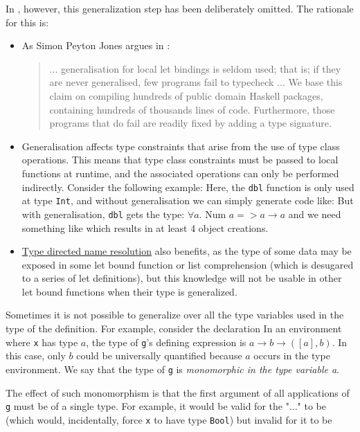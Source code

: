In \frege{}, however, this generalization step has been deliberately omitted. The rationale for this is:
\begin{itemize}
\item As Simon Peyton Jones argues in \cite{lsnbg}:
\begin{quote}
... generalisation for local let bindings is seldom used; that is; if they are never generalised, few programs fail to typecheck ... We base this claim on compiling hundreds of public domain Haskell packages, containing hundreds of thousands lines of code. Furthermore, those programs that do fail are readily fixed by adding a type signature.
\end{quote}
\item Generalisation affects type constraints that arise from the use of type class operations. This means that type class constraints must be passed to local functions at runtime, and the associated operations can only be performed indirectly. Consider the following example: 
Here, the \texttt{dbl} function is only used at type \texttt{Int}, and without generalisation we can simply generate \java{} code like: 
But with generalisation, \texttt{dbl} gets the type:  $\forall a.$ Num $a => a \rightarrow{} a$ and we need something like 
which results in at least 4 object creations.
\item \hyperref[tdnr]{Type directed name resolution} also benefits, as the type of some data may be exposed in some let bound function or list comprehension (which is desugared to a series of let definitions), but this knowledge will not be usable in other let bound functions when their type is generalized.
\end{itemize}

Sometimes it is not possible to generalize over all the type variables used in the type of the definition. For example, consider the declaration  
In an environment where \texttt{x} has type $a$, the type of \texttt{g}'s defining expression is $a \rightarrow{} b \rightarrow{} ([a],b)$. In this case, only $b$ could be universally quantified because $a$ occurs in the type environment. We say that the type of \texttt{g} is \emph{monomorphic in the type variable a}.

The effect of such monomorphism is that the first argument of all applications of \texttt{g} must be of a single type. For example, it would be valid for the "..." to be 
(which would, incidentally, force \texttt{x} to have type \texttt{Bool}) but invalid for it to be 

